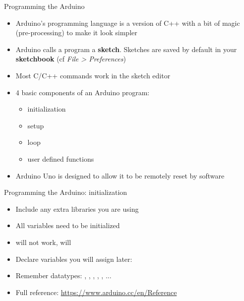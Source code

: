 \documentclass[compress]{beamer}
\begin{document}
\begin{frame}{Programming the Arduino}
    \begin{itemize}
        \item Arduino's programming language is a version of C++ with a bit
            of magic (pre-processing) to make it look simpler

        \item Arduino calls a program a \textbf{sketch}. Sketches are saved
            by default in your \textbf{sketchbook} (cf \emph{File >
            Preferences})
        \item Most C/C++ commands work in the sketch editor
        \item 4 basic components of an Arduino program:
            \begin{itemize}
                \item initialization
                \item setup
                \item loop
                \item user defined functions
            \end{itemize}
        \item Arduino Uno is designed to allow it to be remotely reset by
            software

    \end{itemize}
\end{frame}

\begin{frame}{Programming the Arduino: initialization}
    \begin{itemize}
        \item Include any extra libraries you are using
        \item All variables need to be initialized
        \item {} will not work,  will
        \item Declare variables you will assign later: 
        \item Remember datatypes: , , , , , ...
        \item Full reference: \url{https://www.arduino.cc/en/Reference}
    \end{itemize}
\end{frame}
\end{document}
